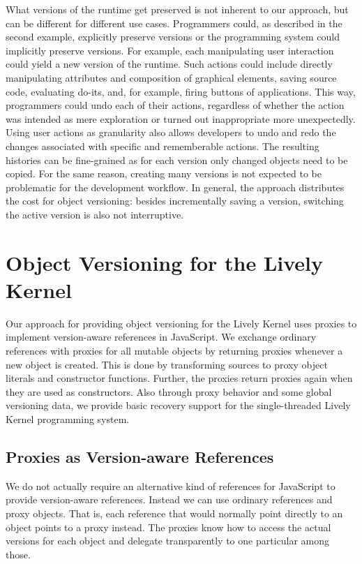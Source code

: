 What versions of the runtime get preserved is not inherent to our approach, but can be different for different use cases.
Programmers could, as described in the second example, explicitly preserve versions or the programming system could implicitly preserve versions.
For example, each manipulating user interaction could yield a new version of the runtime.
Such actions could include directly manipulating attributes and composition of graphical elements, saving source code, evaluating do-its, and, for example, firing buttons of applications.
This way, programmers could undo each of their actions, regardless of whether the action was intended as mere exploration or turned out inappropriate more unexpectedly.
Using user actions as granularity also allows developers to undo and redo the changes associated with specific and rememberable actions.
The resulting histories can be fine-grained as for each version only changed objects need to be copied.
For the same reason, creating many versions is not expected to be problematic for the development workflow.
In general, the approach distributes the cost for object versioning: besides incrementally saving a version, switching the active version is also not interruptive.



\section{Object Versioning for the Lively Kernel} \label{sec:APPROACH:2}

Our approach for providing object versioning for the Lively Kernel uses proxies to implement version-aware references in JavaScript.
We exchange ordinary references with proxies for all mutable objects by returning proxies whenever a new object is created.
This is done by transforming sources to proxy object literals and constructor functions.
Further, the proxies return proxies again when they are used as constructors.
Also through proxy behavior and some global versioning data, we provide basic recovery support for the single-threaded Lively Kernel programming system.


\subsection{Proxies as Version-aware References}

We do not actually require an alternative kind of references for JavaScript to provide version-aware references.
Instead we can use ordinary references and proxy objects.
That is, each reference that would normally point directly to an object points to a proxy instead.
The proxies know how to access the actual versions for each object and delegate transparently to one particular among those.

